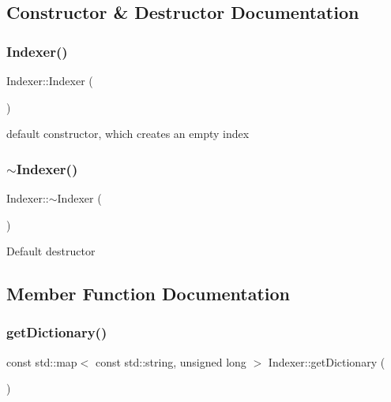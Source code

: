 \subsection{Constructor \& Destructor Documentation}
\mbox{\label{classIndexer_ac4c8c21c68d62185ceddbad8781e3b67}} 
\subsubsection{\texorpdfstring{Indexer()}{Indexer()}}
{\footnotesize\ttfamily Indexer\+::\+Indexer (\begin{DoxyParamCaption}{ }\end{DoxyParamCaption})}

default constructor, which creates an empty index \mbox{\label{classIndexer_aaf5971639a7a2e3d9af4d8da62deb6f4}} 
\subsubsection{\texorpdfstring{$\sim$\+Indexer()}{~Indexer()}}
{\footnotesize\ttfamily Indexer\+::$\sim$\+Indexer (\begin{DoxyParamCaption}{ }\end{DoxyParamCaption})}

Default destructor 

\subsection{Member Function Documentation}
\mbox{\label{classIndexer_a92be0b09f21160df9e927d76dfbe48d1}} 
\subsubsection{\texorpdfstring{get\+Dictionary()}{getDictionary()}}
{\footnotesize\ttfamily const std\+::map$<$ const std\+::string, unsigned long $>$ Indexer\+::get\+Dictionary (\begin{DoxyParamCaption}{ }\end{DoxyParamCaption})}

